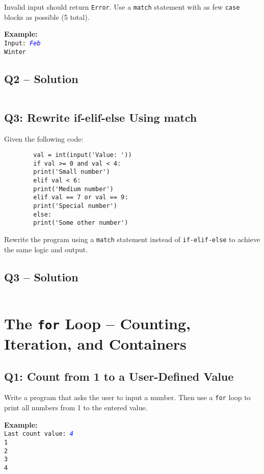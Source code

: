 \documentclass[a4paper,11pt]{article}
\begin{document}
	Invalid input should return \texttt{Error}. Use a \texttt{match} statement with as few \texttt{case} blocks as possible (5 total).
	
	\textbf{Example:}\\
	\texttt{Input: \textcolor{blue}{\textit{Feb}}}\\
	\texttt{Winter}
	
		\subsection*{Q2 – Solution}
	\inputminted{python}{Files/2/2.py}
	
	
	\subsection*{Q3: Rewrite if-elif-else Using match}
	Given the following code:
	
	\begin{verbatim}
		val = int(input('Value: '))
		if val >= 0 and val < 4:
		print('Small number')
		elif val < 6:
		print('Medium number')
		elif val == 7 or val == 9:
		print('Special number')
		else:
		print('Some other number')
	\end{verbatim}
	
	Rewrite the program using a \texttt{match} statement instead of \texttt{if-elif-else} to achieve the same logic and output.
	

	\subsection*{Q3 – Solution}
	\inputminted{python}{Files/2/3.py}
	
	\newpage
	
	\section{The \texttt{for} Loop – Counting, Iteration, and Containers}
	
	\subsection*{Q1: Count from 1 to a User-Defined Value}
	Write a program that asks the user to input a number. Then use a \texttt{for} loop to print all numbers from 1 to the entered value.
	
	\textbf{Example:}\\
	\texttt{Last count value: \textcolor{blue}{\textit{4}}}\\
	\texttt{1\\2\\3\\4}
	
\end{document}
